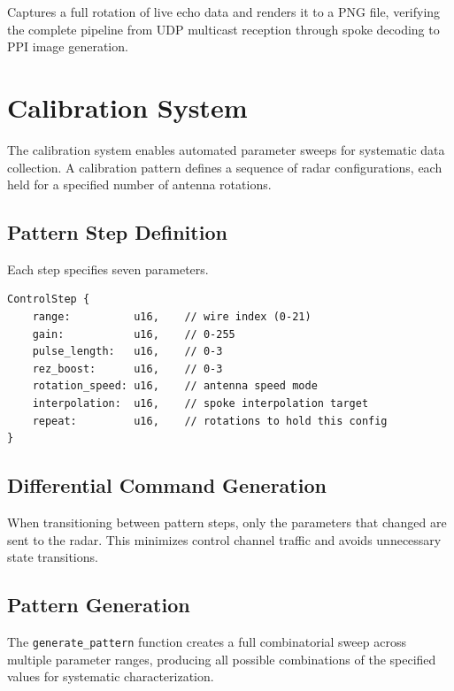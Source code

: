 \documentclass[11pt,letterpaper]{article}
\begin{document}
Captures a full rotation of live echo data and renders it to a PNG file, verifying the complete pipeline from UDP multicast reception through spoke decoding to PPI image generation.


\section{Calibration System}

The calibration system enables automated parameter sweeps for systematic data collection. A calibration pattern defines a sequence of radar configurations, each held for a specified number of antenna rotations.

\subsection{Pattern Step Definition}

Each step specifies seven parameters.

\begin{lstlisting}
ControlStep {
    range:          u16,    // wire index (0-21)
    gain:           u16,    // 0-255
    pulse_length:   u16,    // 0-3
    rez_boost:      u16,    // 0-3
    rotation_speed: u16,    // antenna speed mode
    interpolation:  u16,    // spoke interpolation target
    repeat:         u16,    // rotations to hold this config
}
\end{lstlisting}

\subsection{Differential Command Generation}

When transitioning between pattern steps, only the parameters that changed are sent to the radar. This minimizes control channel traffic and avoids unnecessary state transitions.

\subsection{Pattern Generation}

The \texttt{generate\_pattern} function creates a full combinatorial sweep across multiple parameter ranges, producing all possible combinations of the specified values for systematic characterization.
\end{document}
